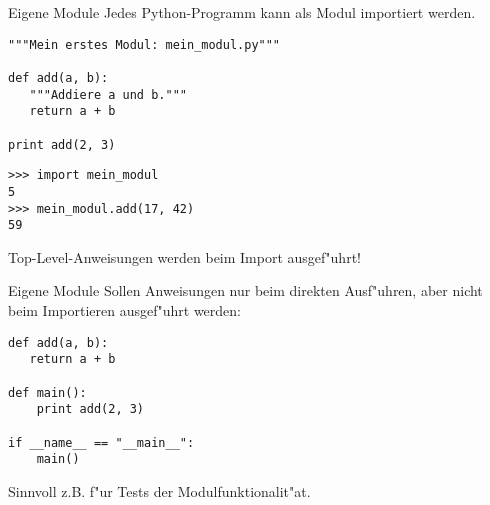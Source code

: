 \begin{frame}[fragile]{Eigene Module}
Jedes Python-Programm kann als Modul importiert werden.
\begin{lstlisting}[style=Python]
"""Mein erstes Modul: mein_modul.py"""

def add(a, b):
   """Addiere a und b."""
   return a + b

print add(2, 3)
\end{lstlisting}
\begin{lstlisting}[style=Shell]
>>> import mein_modul
5
>>> mein_modul.add(17, 42)
59
\end{lstlisting}
Top-Level-Anweisungen werden beim Import ausgef"uhrt!
\end{frame}

\begin{frame}[fragile]{Eigene Module}
Sollen Anweisungen nur beim direkten Ausf"uhren, aber nicht beim Importieren ausgef"uhrt werden:
\vspace{3mm}
\begin{lstlisting}[style=Python]
def add(a, b):
   return a + b

def main():
    print add(2, 3)

if __name__ == "__main__":
    main()
\end{lstlisting}
Sinnvoll z.B. f"ur Tests der Modulfunktionalit"at.
\end{frame}

